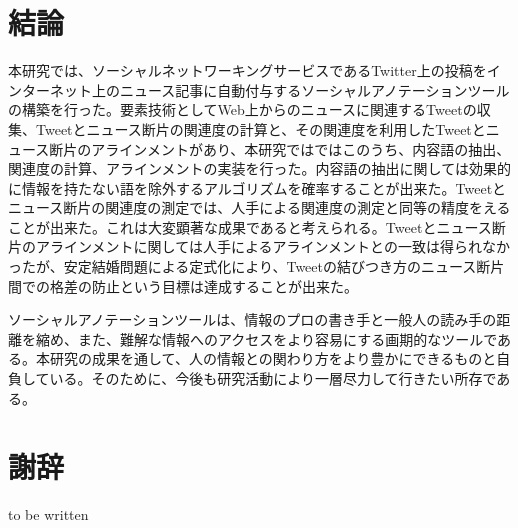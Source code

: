 \documentclass[12pt]{jarticle}
\begin{document}
\section{結論}
本研究では、ソーシャルネットワーキングサービスであるTwitter上の投稿をインターネット上のニュース記事に自動付与するソーシャルアノテーションツールの構築を行った。要素技術としてWeb上からのニュースに関連するTweetの収集、Tweetとニュース断片の関連度の計算と、その関連度を利用したTweetとニュース断片のアラインメントがあり、本研究ではではこのうち、内容語の抽出、関連度の計算、アラインメントの実装を行った。内容語の抽出に関しては効果的に情報を持たない語を除外するアルゴリズムを確率することが出来た。Tweetとニュース断片の関連度の測定では、人手による関連度の測定と同等の精度をえることが出来た。これは大変顕著な成果であると考えられる。Tweetとニュース断片のアラインメントに関しては人手によるアラインメントとの一致は得られなかったが、安定結婚問題による定式化により、Tweetの結びつき方のニュース断片間での格差の防止という目標は達成することが出来た。

ソーシャルアノテーションツールは、情報のプロの書き手と一般人の読み手の距離を縮め、また、難解な情報へのアクセスをより容易にする画期的なツールである。本研究の成果を通して、人の情報との関わり方をより豊かにできるものと自負している。そのために、今後も研究活動により一層尽力して行きたい所存である。

\section{謝辞}
to be written
\end{document}
